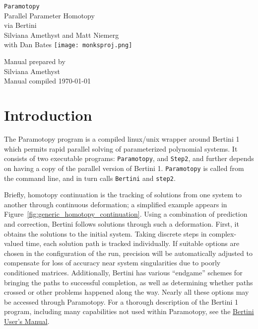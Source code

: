 
	\pagestyle{plain} 
	\setcounter{page}{1}




\thispagestyle{empty}
\begin{center}
{\LARGE \tt Paramotopy}\\[\baselineskip]
Parallel Parameter Homotopy \\ via Bertini \\
\vskip0.5in
Silviana Amethyst and Matt Niemerg  \\
with Dan Bates
\vfill%
\texttt{[image: monksproj.png]}

\end{center}
\null
\vfill
\begin{singlespace}
Manual prepared by\\
Silviana Amethyst\\
 \hfill Manual compiled \today
\end{singlespace}
\newpage





	\tableofcontents
	\eject
	\setcounter{page}{1}
	\eject




\section{Introduction}

The Paramotopy program is a compiled linux/unix wrapper around Bertini 1 which permits rapid parallel solving of parameterized polynomial systems.  It consists of two executable programs: \texttt{Paramotopy}, and \texttt{Step2}, and further depends on having a copy of the parallel version of Bertini 1.  \texttt{Paramotopy} is called from the command line, and in turn calls \texttt{Bertini} and \texttt{step2}.

Briefly, homotopy continuation is the tracking of solutions from one system to another through continuous deformation; a simplified example appears in Figure~\ref{fig:generic_homotopy_continuation}.  Using a combination of prediction and correction, Bertini follows solutions through such a deformation.  First, it obtains the solutions to the initial system.  Taking discrete steps in complex-valued time, each solution path is tracked individually.  If suitable options are chosen in the configuration of the run, precision will be automatically adjusted to compensate for loss of accuracy near system singularities due to poorly conditioned matrices.  Additionally, Bertini has various ``endgame'' schemes for bringing the paths to successful completion, as well as determining whether paths crossed or other problems happened along the way.  Nearly all these options may be accessed through Paramotopy.  For a thorough description of the Bertini 1 program, including many capabilities not used within Paramotopy, see the \href{http://www.nd.edu/~sommese/bertini/BertiniUsersManual.pdf}{Bertini User's Manual}.



